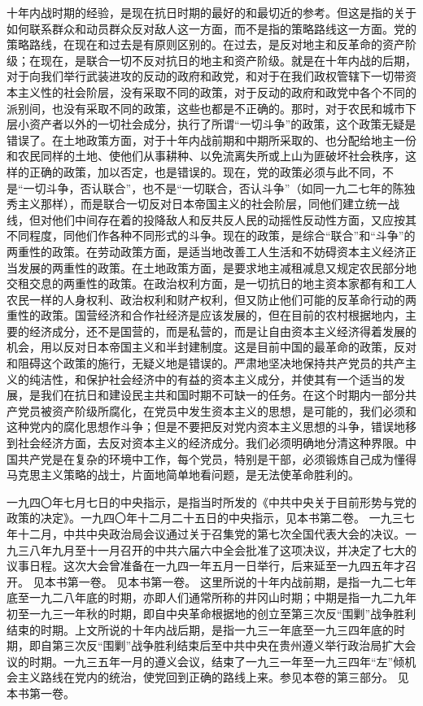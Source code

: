 十年内战时期的经验，是现在抗日时期的最好的和最切近的参考。但这是指的关于如何联系群众和动员群众反对敌人这一方面，而不是指的策略路线这一方面。党的策略路线，在现在和过去是有原则区别的。在过去，是反对地主和反革命的资产阶级；在现在，是联合一切不反对抗日的地主和资产阶级。就是在十年内战的后期，对于向我们举行武装进攻的反动的政府和政党，和对于在我们政权管辖下一切带资本主义性的社会阶层，没有采取不同的政策，对于反动的政府和政党中各个不同的派别间，也没有采取不同的政策，这些也都是不正确的。那时，对于农民和城市下层小资产者以外的一切社会成分，执行了所谓“一切斗争”的政策，这个政策无疑是错误了。在土地政策方面，对于十年内战前期和中期所采取的、也分配给地主一份和农民同样的土地、使他们从事耕种、以免流离失所或上山为匪破坏社会秩序，这样的正确的政策，加以否定，也是错误的。现在，党的政策必须与此不同，不是“一切斗争，否认联合”，也不是“一切联合，否认斗争”（如同一九二七年的陈独秀主义那样），而是联合一切反对日本帝国主义的社会阶层，同他们建立统一战线，但对他们中间存在着的投降敌人和反共反人民的动摇性反动性方面，又应按其不同程度，同他们作各种不同形式的斗争。现在的政策，是综合“联合”和“斗争”的两重性的政策。在劳动政策方面，是适当地改善工人生活和不妨碍资本主义经济正当发展的两重性的政策。在土地政策方面，是要求地主减租减息又规定农民部分地交租交息的两重性的政策。在政治权利方面，是一切抗日的地主资本家都有和工人农民一样的人身权利、政治权利和财产权利，但又防止他们可能的反革命行动的两重性的政策。国营经济和合作社经济是应该发展的，但在目前的农村根据地内，主要的经济成分，还不是国营的，而是私营的，而是让自由资本主义经济得着发展的机会，用以反对日本帝国主义和半封建制度。这是目前中国的最革命的政策，反对和阻碍这个政策的施行，无疑义地是错误的。严肃地坚决地保持共产党员的共产主义的纯洁性，和保护社会经济中的有益的资本主义成分，并使其有一个适当的发展，是我们在抗日和建设民主共和国时期不可缺一的任务。在这个时期内一部分共产党员被资产阶级所腐化，在党员中发生资本主义的思想，是可能的，我们必须和这种党内的腐化思想作斗争；但是不要把反对党内资本主义思想的斗争，错误地移到社会经济方面，去反对资本主义的经济成分。我们必须明确地分清这种界限。中国共产党是在复杂的环境中工作，每个党员，特别是干部，必须锻炼自己成为懂得马克思主义策略的战士，片面地简单地看问题，是无法使革命胜利的。


\begin{maonote}
一九四〇年七月七日的中央指示，是指当时所发的《中共中央关于目前形势与党的政策的决定》。一九四〇年十二月二十五日的中央指示，见本书第二卷。
一九三七年十二月，中共中央政治局会议通过关于召集党的第七次全国代表大会的决议。一九三八年九月至十一月召开的中共六届六中全会批准了这项决议，并决定了七大的议事日程。这次大会曾准备在一九四一年五月一日举行，后来延至一九四五年才召开。
见本书第一卷。
见本书第一卷。
这里所说的十年内战前期，是指一九二七年底至一九二八年底的时期，亦即人们通常所称的井冈山时期；中期是指一九二九年初至一九三一年秋的时期，即自中央革命根据地的创立至第三次反“围剿”战争胜利结束的时期。上文所说的十年内战后期，是指一九三一年底至一九三四年底的时期，即自第三次反“围剿”战争胜利结束后至中共中央在贵州遵义举行政治局扩大会议的时期。一九三五年一月的遵义会议，结束了一九三一年至一九三四年“左”倾机会主义路线在党内的统治，使党回到正确的路线上来。参见本卷的第三部分。
见本书第一卷。
\end{maonote}

